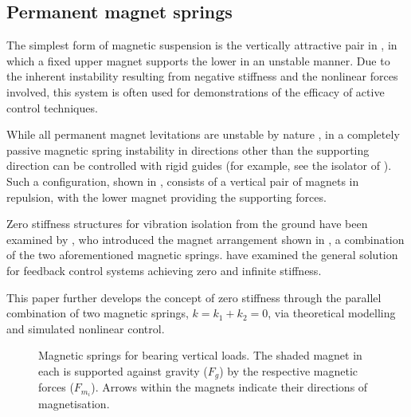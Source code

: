 \subsection{Permanent magnet springs}

The simplest form of magnetic suspension is the vertically
attractive pair in , in which a fixed upper
magnet supports the lower in an unstable manner. Due to the inherent
instability resulting from negative stiffness and the nonlinear
forces involved, this system is often used for demonstrations of the
efficacy of active control techniques.

While all permanent magnet levitations are unstable by nature
\cite{earnshaw1842,tonks1940}, in a completely passive magnetic
spring instability in directions other than the supporting direction
can be controlled with rigid guides (for example, see the isolator
of \textcite{puppin2002}). Such a configuration,
shown in , consists of a vertical pair of
magnets in repulsion, with the lower magnet providing the supporting
forces.

Zero stiffness structures for vibration isolation from the ground
have been examined by \textcite{nijsse2001}, who introduced the
magnet arrangement shown in , a combination of
the two aforementioned magnetic springs. \textcite{xing2005}
have examined the general solution for feedback control systems
achieving zero and infinite stiffness. \iffalse The latter, for
rejection of direct disturbance on the supported stage, has been
researched by \textcite{mizuno2003b}, in which the series
combination of a conventional positive spring and a negative
magnetic spring results in theoretically infinite static stiffness
in total:
\begin{align*}
\frac{1}{k} & = \frac{1}{k_1} + \frac{1}{k_2} , &
\therefore k & = \frac{k_1k_2}{k_1+k_2} = \infty, \text{~if~} k_1+k_2=0 .
\end{align*}
\fi

This paper further develops the concept of zero stiffness through
the parallel combination of two magnetic springs, $k = k_1+k_2 = 0$,
via theoretical modelling and simulated nonlinear control.

\begin{figure}
  \caption{
    Magnetic springs for bearing vertical loads. The shaded magnet
    in each is supported against gravity ($F_g$) by the respective
    magnetic forces ($F_{m_i}$). Arrows within the magnets indicate their
    directions of magnetisation.}
\end{figure}

